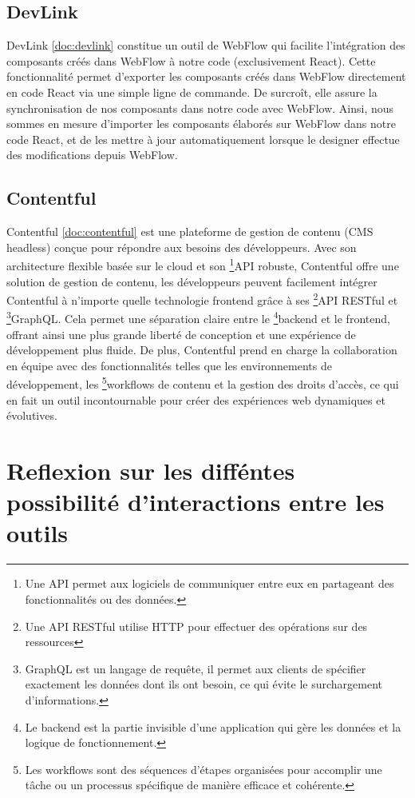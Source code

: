 \subsection{DevLink}
DevLink \ref{doc:devlink} constitue un outil de WebFlow qui facilite l'intégration des composants créés dans WebFlow à notre code (exclusivement React). Cette fonctionnalité permet d'exporter les composants créés dans WebFlow directement en code React via une simple ligne de commande. De surcroît, elle assure la synchronisation de nos composants dans notre code avec WebFlow. Ainsi, nous sommes en mesure d'importer les composants élaborés sur WebFlow dans notre code React, et de les mettre à jour automatiquement lorsque le designer effectue des modifications depuis WebFlow. 

\subsection{Contentful}
Contentful \ref{doc:contentful} est une plateforme de gestion de contenu (CMS headless) conçue pour répondre aux besoins des développeurs. Avec son architecture flexible basée sur le cloud et son \footnote{Une API permet aux logiciels de communiquer entre eux en partageant des fonctionnalités ou des données.}API robuste, Contentful offre une solution de gestion de contenu, les développeurs peuvent facilement intégrer Contentful à n'importe quelle technologie frontend grâce à ses \footnote{Une API RESTful utilise HTTP pour effectuer des opérations sur des ressources}API RESTful et \footnote{GraphQL est un langage de requête, il permet aux clients de spécifier exactement les données dont ils ont besoin, ce qui évite le surchargement d'informations.}GraphQL. Cela permet une séparation claire entre le \footnote{Le backend est la partie invisible d'une application qui gère les données et la logique de fonctionnement.}backend et le frontend, offrant ainsi une plus grande liberté de conception et une expérience de développement plus fluide. De plus, Contentful prend en charge la collaboration en équipe avec des fonctionnalités telles que les environnements de développement, les \footnote{Les workflows sont des séquences d'étapes organisées pour accomplir une tâche ou un processus spécifique de manière efficace et cohérente.}workflows de contenu et la gestion des droits d'accès, ce qui en fait un outil incontournable pour créer des expériences web dynamiques et évolutives.

\section{Reflexion sur les difféntes possibilité d'interactions entre les outils}


